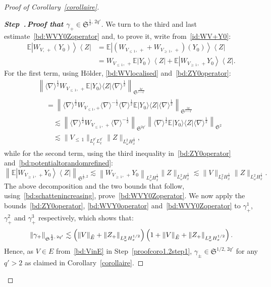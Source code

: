 \documentclass[AHL, Unicode, longabstracts,published]{cedram}
\newcommand{\E}{\mathbb{E}}
\newcommand{\frkS}{\mathfrak{S}}
\newcounter{stepcount}
\newenvironment{step}[1]{\refstepcounter{stepcount}\begin{proof}[{\bf{Step~\thestepcount}{.\,\emph{#1}}}]}{\let\qed\relax\end{proof}}
\let\oldtilde\tilde
\renewcommand*{\tilde}[1]{\mathchoice{\widetilde{#1}}{\widetilde{#1}}{\oldtilde{#1}}{\oldtilde{#1}}}
\begin{document}
\begin{proof}[Proof of Corollary~\ref{corollaire}]
\begin{step}{{Proof that $\gamma_+\in \frkS^{\frac 12,\,2q'}$}}
We turn to the third and last estimate~\eqref{bd:WVY0Zoperator} and, to prove it, write from~\eqref{id:WV+Y0}:
\begin{align*}
\E \left|W_{V,\,+}(Y_0)\right\rangle \left\langle Z \right|&=\E\left|\left(W_{V_{\leq\,1},\,+}+W_{V_{\geq\,1},\,+}\right)(Y_0)\right\rangle \left\langle Z\right|\\
&=W_{V_{\leq\,1},\,+} \E\left|Y_0\right\rangle \left\langle Z \right|+\E \left|W_{V_{\geq\,1},\,+}Y_0\right\rangle \left\langle Z \right|.
\end{align*}
For the first term, using H\"older, \eqref{bd:WVlocalised} and~\eqref{bd:ZY0operator}:
\begin{multline*}
\left\| \langle \nabla \rangle^{\frac 12} W_{V_{\leq\, 1},\,+} \E|Y_0\rangle \langle Z |\langle \nabla \rangle^{\frac 12} \right\|_{\frkS^{\frac{2q'}{1+q'}}}
\\
\begin{aligned}
&= \left\| \langle \nabla \rangle^{\frac 12} W_{V_{\leq 1},+} \langle \nabla \rangle^{-\frac 12}\langle \nabla \rangle^{\frac 12} \E|Y_0\rangle \langle Z |\langle \nabla \rangle^{\frac 12} \right\|_{\frkS^{\frac{2q'}{1+q'}}} \\
&\quad\lesssim \left\| \langle \nabla \rangle^{\frac 12} W_{V_{\leq\,1},\,+} \langle \nabla \rangle^{-\frac 12}\right\|_{\frkS^{2q'}} \left\| \langle \nabla \rangle^{\frac 12} \E|Y_0\rangle \langle Z |\langle \nabla \rangle^{\frac 12} \right\|_{\frkS^{2}}\\
&\quad\lesssim \| V_{\leq\,1}\|_{L^{p'}_tL^{q'}_x} \| Z\|_{L^2_\omega H^{\frac 12}_x},
\end{aligned}
\end{multline*}
while for the second term, using the third inequality in~\eqref{bd:ZY0operator} and~\eqref{bd:potentialtorandomrefined}:
\[
\left\| \E \left|W_{V_{\geq\,1},\,+}Y_0\right\rangle \left\langle Z \right|\right\|_{\frkS^{\frac 12,2}} \lesssim \left\| W_{V_{\geq\,1},\,+}Y_0\right\|_{L^2_\omega H^{\frac 12}_x} \| Z \|_{L^2_\omega H^{\frac 12}_x}\lesssim \| V\|_{L^2_tH^{\frac12}_x} \| Z \|_{L^2_\omega H^{\frac 12}_x}.
\]
The above decomposition and the two bounds that follow, using~\eqref{bd:schattenincreasing}, prove~\eqref{bd:WVY0Zoperator}. We now apply the bounds~\eqref{bd:ZY0operator}, \eqref{bd:WVY0operator} and~\eqref{bd:WVY0Zoperator} to $\gamma_+^1$, $\gamma_+^2$ and $\gamma_+^3$ respectively, which shows that:
\[
\left\| \gamma_+\right\|_{\frkS^{\frac 12,\,2q'}}\lesssim \left(\| V\|_{\tilde E}+\left\| Z_+ \right\|_{L^2_\omega H^{1/2}_x} \right)\left(1+\| V\|_{\tilde E}+\left\| Z_+ \right\|_{L^2_\omega H^{1/2}_x}\right).
\]
Hence, as $V\in E$ from~\eqref{bd:VinE} in Step~\ref{proofcoro1.2step1}, $\gamma_\pm \in \frkS^{1/2,\,2q'}$ for any $q'>2$ as claimed in Corollary~\ref{corollaire}.
\end{step}


\end{proof}
\end{document}

